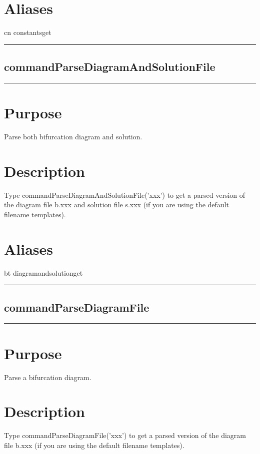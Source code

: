 \documentclass[12pt]{report}
\begin{document}
\begin{minipage}{6in}
    \section*{Aliases}
cn constantsget \medskip\hrule\end{minipage}\subsection{commandParseDiagramAndSolutionFile} \label{sec:clui_ref_commandParseDiagramAndSolutionFile}\begin{minipage}{6in}\hrule\medskip\section*{Purpose}
Parse both bifurcation diagram and solution.\section*{Description}

    Type commandParseDiagramAndSolutionFile('xxx') to get a parsed version of the diagram file b.xxx
    and solution file s.xxx (if you are using the default filename
    templates).
    \section*{Aliases}
bt diagramandsolutionget \medskip\hrule\end{minipage}\subsection{commandParseDiagramFile} \label{sec:clui_ref_commandParseDiagramFile}\begin{minipage}{6in}\hrule\medskip\section*{Purpose}
Parse a bifurcation diagram.\section*{Description}

    Type commandParseDiagramFile('xxx') to get a parsed version of the diagram file b.xxx
    (if you are using the default filename templates).

\end{minipage}
\end{document}
